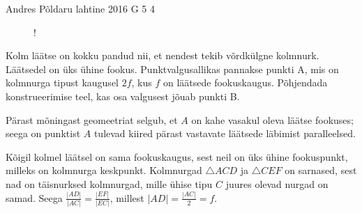 {Andres Põldaru} %
{lahtine} %
{2016} %
{G 5} %
{4} %
{
\ifStatement
\begin{wrapfigure}[8]{r}{0.6\textwidth}
	\vspace{-20pt}
	\begin{resizebox}{0.6\textwidth}{!}{
}
	\end{resizebox}
\end{wrapfigure}

Kolm läätse on kokku pandud nii, et nendest tekib võrdkülgne kolmnurk. Läätsedel on üks ühine fookus. Punktvalgusallikas pannakse punkti A, mis on kolmnurga tipust kaugusel $2f$, kus $f$ on läätsede fookuskaugus. Põhjendada konstrueerimise teel, kas osa valgusest jõuab punkti B.
\fi


\ifHint
Pärast mõningast geomeetriat selgub, et $A$ on kahe vasakul oleva läätse fookuses; seega on punktist $A$ tulevad kiired pärast vastavate läätsede läbimist paralleelsed.
\fi


\ifSolution
Kõigil kolmel läätsel on sama fookuskaugus, sest neil on üks ühine fookuspunkt, milleks on kolmnurga keskpunkt. Kolmnurgad $\triangle ACD$ ja $\triangle CEF$ on sarnased, sest nad on täisnurksed kolmnurgad, mille ühise tipu $C$ juures olevad nurgad on samad. Seega $\frac{|AD|}{|AC|}=\frac{|EF|}{|EC|}$, millest $|AD| = \frac{|AC|}{2} = f$.

}
